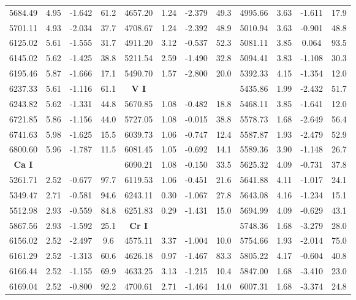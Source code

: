 \documentclass[dvips,12pt,a4paper]{report}
\begin{document}
{{\begin{table}[h]
\begin{tabular}{c c c c | c c c c | c c c c}
5684.49 & 4.95 & -1.642 &  61.2 & 4657.20 & 1.24 & -2.379 &  49.3 & 4995.66 & 3.63 & -1.611 &  17.9 \\
5701.11 & 4.93 & -2.034 &  37.7 & 4708.67 & 1.24 & -2.392 &  48.9 & 5010.94 & 3.63 & -0.901 &  48.8 \\
6125.02 & 5.61 & -1.555 &  31.7 & 4911.20 & 3.12 & -0.537 &  52.3 & 5081.11 & 3.85 &  0.064 &  93.5 \\
6145.02 & 5.62 & -1.425 &  38.8 & 5211.54 & 2.59 & -1.490 &  32.8 & 5094.41 & 3.83 & -1.108 &  30.3 \\
6195.46 & 5.87 & -1.666 &  17.1 & 5490.70 & 1.57 & -2.800 &  20.0 & 5392.33 & 4.15 & -1.354 &  12.0 \\
6237.33 & 5.61 & -1.116 &  61.1 & \textbf{V I}  & & & & 5435.86 & 1.99 & -2.432 &  51.7 \\
6243.82 & 5.62 & -1.331 &  44.8 & 5670.85 & 1.08 & -0.482 &  18.8 & 5468.11 & 3.85 & -1.641 &  12.0 \\
6721.85 & 5.86 & -1.156 &  44.0 & 5727.05 & 1.08 & -0.015 &  38.8 & 5578.73 & 1.68 & -2.649 &  56.4 \\
6741.63 & 5.98 & -1.625 &  15.5 & 6039.73 & 1.06 & -0.747 &  12.4 & 5587.87 & 1.93 & -2.479 &  52.9 \\
6800.60 & 5.96 & -1.787 &  11.5 & 6081.45 & 1.05 & -0.692 &  14.1 & 5589.36 & 3.90 & -1.148 &  26.7 \\
\textbf{Ca I} & & &  & 6090.21 & 1.08 & -0.150 &  33.5 & 5625.32 & 4.09 & -0.731 &  37.8 \\
5261.71 & 2.52 & -0.677 &  97.7 & 6119.53 & 1.06 & -0.451 &  21.6 & 5641.88 & 4.11 & -1.017 &  24.1 \\
5349.47 & 2.71 & -0.581 &  94.6 & 6243.11 & 0.30 & -1.067 &  27.8 & 5643.08 & 4.16 & -1.234 &  15.1 \\
5512.98 & 2.93 & -0.559 &  84.8 & 6251.83 & 0.29 & -1.431 &  15.0 & 5694.99 & 4.09 & -0.629 &  43.1 \\
5867.56 & 2.93 & -1.592 &  25.1 & \textbf{Cr I} & & &  & 5748.36 & 1.68 & -3.279 &  28.0 \\
6156.02 & 2.52 & -2.497 &   9.6 & 4575.11 & 3.37 & -1.004 &  10.0 & 5754.66 & 1.93 & -2.014 &  75.0 \\
6161.29 & 2.52 & -1.313 &  60.6 & 4626.18 & 0.97 & -1.467 &  83.3 & 5805.22 & 4.17 & -0.604 &  40.8 \\
6166.44 & 2.52 & -1.155 &  69.9 & 4633.25 & 3.13 & -1.215 &  10.4 & 5847.00 & 1.68 & -3.410 &  23.0 \\
6169.04 & 2.52 & -0.800 &  92.2 & 4700.61 & 2.71 & -1.464 &  14.0 & 6007.31 & 1.68 & -3.374 &  24.8 \\

\end{tabular}
\end{table}}}
\end{document}
